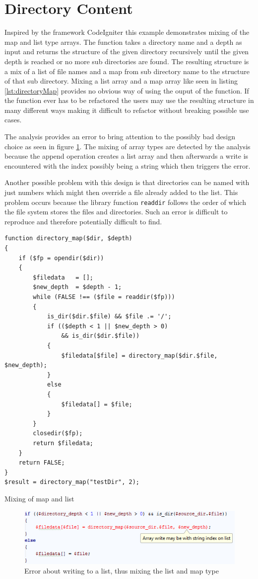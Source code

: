 \section{Directory Content}
Inspired by the framework CodeIgniter this example demonstrates mixing of the map and list type arrays. The function takes a directory name and a depth as input and returns the structure of the given directory recursively until the given depth is reached or no more sub directories are found. The resulting structure is a mix of a list of file names and a map from sub directory name to the structure of that sub directory. Mixing a list array and a map array like seen in listing \ref{lst:directoryMap} provides no obvious way of using the ouput of the function. If the function ever has to be refactored the users may use the resulting structure in many different ways making it difficult to refactor without breaking possible use cases.

The analysis provides an error to bring attention to the possibly bad design choice as seen in figure \ref{fig:directoryScreenshot}. The mixing of array types are detected by the analysis because the append operation creates a list array and then afterwards a write is encountered with the index possibly being a string which then triggers the error.

Another possible problem with this design is that directories can be named with just numbers which might then override a file already added to the list. This problem occurs because the library function \texttt{readdir} follows the order of which the file system stores the files and directories. Such an error is difficult to reproduce and therefore potentially difficult to find.

\begin{program}
\begin{lstlisting}
function directory_map($dir, $depth)
{
    if ($fp = opendir($dir))
    {
        $filedata	= [];
        $new_depth	= $depth - 1;
        while (FALSE !== ($file = readdir($fp)))
        {
            is_dir($dir.$file) && $file .= '/';
            if (($depth < 1 || $new_depth > 0) 
                && is_dir($dir.$file))
            {
                $filedata[$file] = directory_map($dir.$file, $new_depth);
            }
            else
            {
                $filedata[] = $file;
            }
        }
        closedir($fp);
        return $filedata;
    }
    return FALSE;
}
$result = directory_map("testDir", 2);
\end{lstlisting}
\caption{Mixing of map and list}
\label{lst:directoryMap}
\end{program}

\begin{figure}[htbp]
\centering
\includegraphics[scale=0.6]{chapters/caseStudy/directoryError}
\caption{Error about writing to a list, thus mixing the list and map type}
\label{fig:directoryScreenshot}
\end{figure}